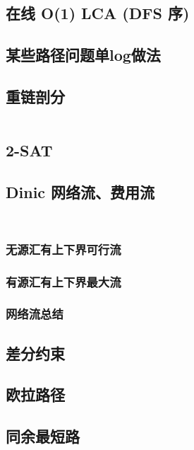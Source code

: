 \documentclass[12pt, a4paper, oneside]{ctexart}
\begin{document}
\begin{multicols}{2}
        \subsection{在线 O(1) LCA (DFS 序)} 
        


        \subsection{某些路径问题单log做法}
        
        \subsection{重链剖分}
        \inputminted{cpp}{src/graph/HLD.cpp}
        \subsection{2-SAT}
        
        \subsection{Dinic 网络流、费用流}
        \inputminted{cpp}{src/graph/dinic-flow.cpp}
        \inputminted{cpp}{src/graph/dinic-cost.cpp}
        \subsubsection{无源汇有上下界可行流}
        
        \subsubsection{有源汇有上下界最大流}
        
        \subsubsection{网络流总结}
        \subsection{差分约束}
        
        \subsection{欧拉路径}
        
        \subsection{同余最短路}
        

\end{multicols}
\end{document}
